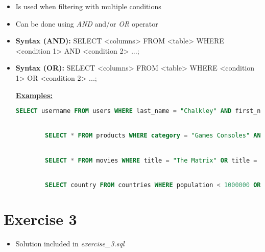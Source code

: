 \documentclass[12pt]{article}
\begin{document}
\begin{itemize}
    \item Is used when filtering with multiple conditions
    \item Can be done using \textit{AND} and/or \textit{OR} operator
    \item \textbf{Syntax (AND):} SELECT <columns> FROM <table> WHERE <condition 1> AND <condition 2> ...;
    \item \textbf{Syntax (OR):} SELECT <columns> FROM <table> WHERE <condition 1> OR <condition 2> ...;

    \bigskip

    \underline{\textbf{Examples:}}

    \bigskip

    \begin{lstlisting}[language=SQL]
        SELECT username FROM users WHERE last_name = "Chalkley" AND first_name = "Andrew";


        SELECT * FROM products WHERE category = "Games Consoles" AND price < 400;


        SELECT * FROM movies WHERE title = "The Matrix" OR title = "The Matrix Reloaded" OR title = "The Matrix Revolutions";


        SELECT country FROM countries WHERE population < 1000000 OR population > 100000000;
    \end{lstlisting}
\end{itemize}

\bigskip

\section{Exercise 3}

\bigskip

\begin{itemize}
    \item Solution included in \textit{exercise\_3.sql}
\end{itemize}

\bigskip
\end{document}
